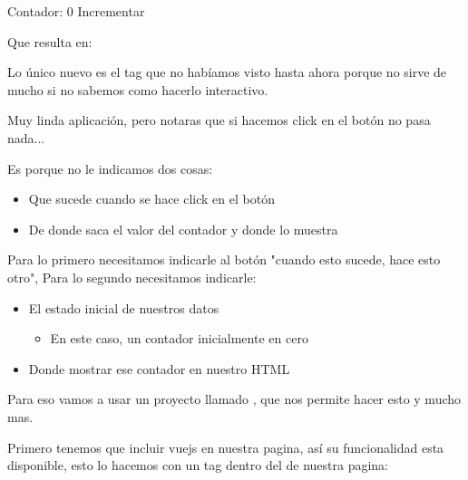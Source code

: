 \documentclass[letterpaper,10pt,spanish]{sphinxmanual}
\begin{document}
%
\begin{sphinxVerbatim}[commandchars=\\\{\}]
    Contador: 0
    Incrementar
\end{sphinxVerbatim}

Que resulta en:



Lo único nuevo es el tag  que no habíamos visto hasta ahora porque
no sirve de mucho si no sabemos como hacerlo interactivo.

Muy linda aplicación, pero notaras que si hacemos click en el botón no pasa nada...

Es porque no le indicamos dos cosas:
\begin{itemize}
\item {} 
Que sucede cuando se hace click en el botón

\item {} 
De donde saca el valor del contador y donde lo muestra

\end{itemize}

Para lo primero necesitamos indicarle al botón "cuando esto sucede, hace esto otro",
Para lo segundo necesitamos indicarle:
\begin{itemize}
\item {} 
El estado inicial de nuestros datos
\begin{itemize}
\item {} 
En este caso, un contador inicialmente en cero

\end{itemize}

\item {} 
Donde mostrar ese contador en nuestro HTML

\end{itemize}

Para eso vamos a usar un proyecto llamado , que
nos permite hacer esto y mucho mas.

Primero tenemos que incluir vuejs en nuestra pagina, así su funcionalidad esta
disponible, esto lo hacemos con un tag  dentro del  de nuestra pagina:
\end{document}
